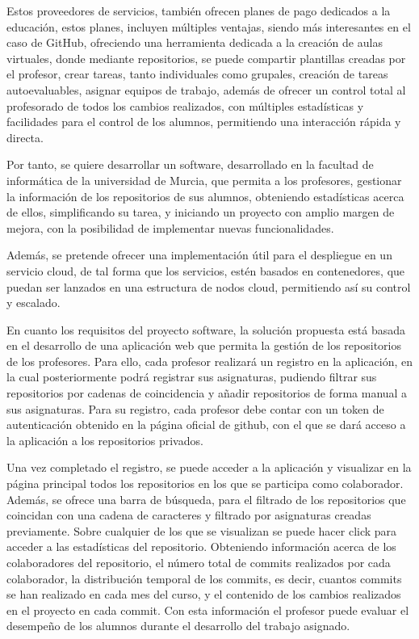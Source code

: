 Estos proveedores de servicios, también ofrecen planes de pago
dedicados a la educación, estos planes, incluyen múltiples ventajas,
siendo más interesantes en el caso de GitHub, ofreciendo una
herramienta dedicada a la creación de aulas virtuales, donde mediante
repositorios, se puede compartir plantillas creadas por el profesor,
crear tareas, tanto individuales como grupales, creación de tareas
autoevaluables, asignar equipos de trabajo, además de ofrecer un
control total al profesorado de todos los cambios realizados, con
múltiples estadísticas y facilidades para el control de los alumnos,
permitiendo una interacción rápida y directa.

Por tanto, se quiere desarrollar un software, desarrollado en la
facultad de informática de la universidad de Murcia, que permita a los
profesores, gestionar la información de los repositorios de sus
alumnos, obteniendo estadísticas acerca de ellos, simplificando su
tarea, y iniciando un proyecto con amplio margen de mejora, con la
posibilidad de implementar nuevas funcionalidades.

Además, se pretende ofrecer una implementación útil para el despliegue
en un servicio cloud, de tal forma que los servicios, estén basados en
contenedores, que puedan ser lanzados en una estructura de nodos
cloud, permitiendo así su control y escalado.

En cuanto los requisitos del proyecto software, la solución propuesta
está basada en el desarrollo de una aplicación web que permita la
gestión de los repositorios de los profesores. Para ello, cada
profesor realizará un registro en la aplicación, en la cual
posteriormente podrá registrar sus asignaturas, pudiendo filtrar sus
repositorios por cadenas de coincidencia y añadir repositorios de
forma manual a sus asignaturas. Para su registro, cada profesor debe
contar con un token de autenticación obtenido en la página oficial de
github, con el que se dará acceso a la aplicación a los repositorios
privados.

Una vez completado el registro, se puede acceder a la aplicación y
visualizar en la página principal todos los repositorios en los que se
participa como colaborador. Además, se ofrece una barra de búsqueda,
para el filtrado de los repositorios que coincidan con una cadena de
caracteres y filtrado por asignaturas creadas previamente. Sobre
cualquier de los que se visualizan se puede hacer click para acceder a
las estadísticas del repositorio. Obteniendo información acerca de los
colaboradores del repositorio, el número total de commits realizados
por cada colaborador, la distribución temporal de los commits, es
decir, cuantos commits se han realizado en cada mes del curso, y el
contenido de los cambios realizados en el proyecto en cada commit. Con
esta información el profesor puede evaluar el desempeño de los alumnos
durante el desarrollo del trabajo asignado.

